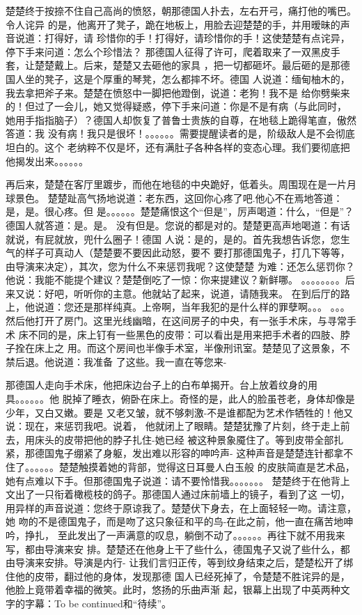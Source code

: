 楚楚终于按捺不住自己高尚的愤怒，朝那德国人扑去，左右开弓，痛打他的嘴巴。令人诧异
的是，他离开了凳子，跪在地板上，用脸去迎楚楚的手，并用暧昧的声音说道：打得好，请
珍惜你的手！打得好，请珍惜你的手！这使楚楚有点诧异，停下手来问道：怎么个珍惜法？
那德国人征得了许可，爬着取来了一双黑皮手套，让楚楚戴上。后来，楚楚又去砸他的家具
，把一切都砸坏。最后砸的是那德国人坐的凳子，这是个厚重的琴凳，怎么都摔不坏。德国
人说道：缅甸柚木的，我去拿把斧子来。楚楚在愤怒中一脚把他蹬倒，说道：老狗！我不是
给你劈柴来的！但过了一会儿，她又觉得疑惑，停下手来问道：你是不是有病（与此同时，
  她用手指指脑子）？德国人却恢复了普鲁士贵族的自尊，在地毯上跪得笔直，傲然答道：我
没有病！我只是很坏！。。。。。。需要提醒读者的是，阶级敌人是不会彻底坦白的。这个
老纳粹不仅是坏，还有满肚子各种各样的变态心理。我们要彻底把他揭发出来。。。。。。

再后来，楚楚在客厅里踱步，而他在地毯的中央跪好，低着头。周围现在是一片月球景色。
楚楚趾高气扬地说道：老东西，这回你心疼了吧.他心不在焉地答道：是，是。很心疼。但
是。。。。。。楚楚痛恨这个“但是”，厉声喝道：什么，“但是”？德国人就答道：是。是。
没有但是。您说的都是对的。楚楚更高声地喝道：有话就说，有屁就放，兜什么圈子！德国
人说：是的，是的。首先我想告诉您，您生气的样子可真动人（楚楚要不要因此动怒，要不
  要打那德国鬼子，打几下等等，由导演来决定），其次，您为什么不来惩罚我呢？这使楚楚
为难：还怎么惩罚你？他说：我能不能提个建议？楚楚倒吃了一惊：你来提建议？新鲜哪。
。。。。。。。。后来又说：好吧，听听你的主意。他就站了起来，说道，请随我来。
在到后厅的路上，他说道：您还是那样纯真。上帝啊，当年我犯的是什么样的罪孽啊。。。
。。。然后他打开了房门。这里光线幽暗，在这间房子的中央，有一张手术床，与寻常手术
床不同的是，床上钉有一些黑色的皮带：可以看出是用来把手术者的四肢、脖子拴在床上之
用。而这个房间也半像手术室，半像刑讯室。楚楚见了这景象，不禁后退。他说道：我准备
了这些。我一直在等您来-


那德国人走向手术床，他把床边台子上的白布单揭开。台上放着纹身的用具。。。。。。他
脱掉了睡衣，俯卧在床上。奇怪的是，此人的脸虽苍老，身体却像是少年，又白又嫩。要是
又老又皱，就不够刺激-不是谁都配为艺术作牺牲的！他又说：现在，来惩罚我吧。说着，
他就闭上了眼睛。楚楚犹豫了片刻，终于走上前去，用床头的皮带把他的脖子扎住-她已经
被这种景象魇住了。等到皮带全部扎紧，那德国鬼子绷紧了身躯，发出难以形容的呻吟声-
这种声音是楚楚连针都拿不住了。。。。。。楚楚触摸着她的背部，觉得这日耳曼人白玉般
的皮肤简直是艺术品，她有点难以下手。但那德国鬼子说道：请不要怜惜我。。。。。。。
楚楚终于在他背上文出了一只衔着橄榄枝的鸽子。那德国人通过床前墙上的镜子，看到了这
一切，用异样的声音说道：您终于原谅我了。楚楚伏下身去，在上面轻轻一吻。请注意，她
吻的不是德国鬼子，而是吻了这只象征和平的鸟-在此之前，他一直在痛苦地呻吟，挣扎，
至此发出了一声满意的叹息，躺倒不动了。。。。。。再往下就不用我来写，都由导演来安
排。楚楚还在他身上干了些什么，德国鬼子又说了些什么，都由导演来安排。导演是内行-
让我们言归正传，等到纹身结束之后，楚楚松开了绑住他的皮带，翻过他的身体，发现那德
国人已经死掉了，令楚楚不胜诧异的是，他脸上竟带着幸福的微笑。此时，悠扬的乐曲声渐
起，银幕上出现了中英两种文字的字幕：To be continued和“待续”。
